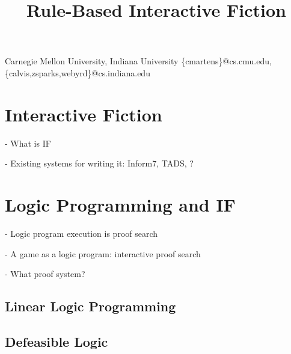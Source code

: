 \documentclass[computermodern]{sigplanconf}
\begin{document}


\title{Rule-Based Interactive Fiction}


           {Carnegie Mellon University, Indiana University}
           {\{cmartens\}@cs.cmu.edu,\{calvis,zsparks,webyrd\}@cs.indiana.edu}

\maketitle

\section{Interactive Fiction}

- What is IF

- Existing systems for writing it: Inform7, TADS, ?

\section{Logic Programming and IF}

- Logic program execution is proof search

- A game as a logic program: interactive proof search

- What proof system?

\subsection{Linear Logic Programming}

\subsection{Defeasible Logic}

\nocite{Covington:1996:PPD:230996}
\nocite{apt03principles}
\nocite{Marriottp98Pwc}

%


\end{document}
